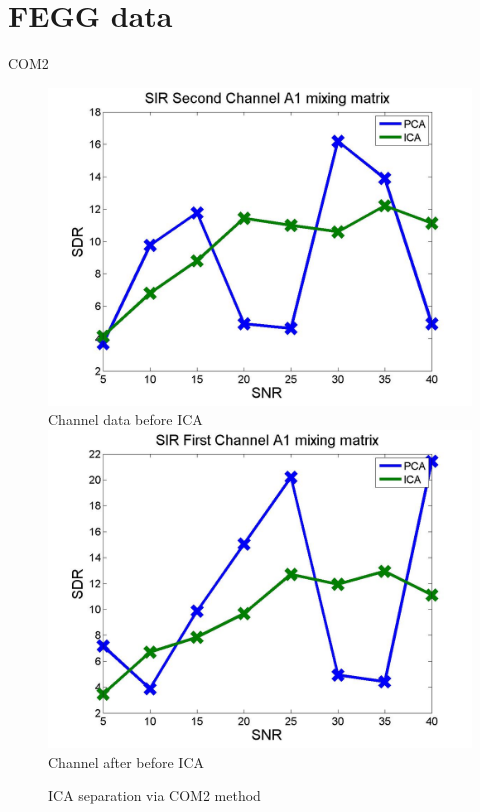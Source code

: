 \documentclass[t,12pt,english
\ifx\beamermode\undefined\else,\beamermode\fi
]{beamer}
\begin{document}
\section{FEGG data}
\begin{frame}{COM2}

\begin{figure}[!htbp]
%
\centering
\includegraphics[width=1\textwidth]{6.jpg}\\
\tiny{Channel data before ICA}\label{a9}
\endminipage\hfill
{}%
\centering
\includegraphics[width=1\textwidth]{5.jpg}\\
\tiny{Channel after before ICA}\label{a10}
\endminipage\hfill
\caption{\tiny ICA separation via COM2 method}
\end{figure}
  
\end{frame}
\end{document}
